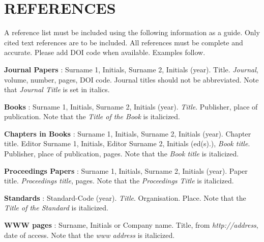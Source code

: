 \documentclass[10pt]{JoME}
\begin{document}
\section{REFERENCES}

A reference list must be included using the following information as a guide. Only cited text references are to be included. All references must be complete and accurate. Please add DOI code when available. Examples follow.
 
\textrm{\textbf{Journal Papers}  \cite{bib1}: 
Surname 1, Initials, Surname 2, Initials (year). Title. \textit{Journal}, volume, number, pages, DOI code. Journal titles should not be abbreviated. Note that \textit{Journal Title} is set in italics.} 

\textrm{\textbf{Books} \cite{bib2}: Surname 1, Initials, Surname 2, Initials (year). \textit{Title}. Publisher, place of publication. Note that the \textit{Title of the Book} is italicized.} 

\textrm{\textbf{Chapters in Books} \cite{bib3}:
Surname 1, Initials, Surname 2, Initials (year). Chapter title. Editor Surname 1, Initials, Editor Surname 2, Initials (ed(s).), \textit{Book title}. Publisher, place of publication, pages. Note that the \textit{Book title} is italicized.}

\textrm{\textbf{Proceedings Papers}  \cite{bib4}:
Surname 1, Initials, Surname 2, Initials (year). Paper title. \textit{Proceedings title}, pages. Note that the \textit{Proceedings Title} is italicized.}

\textrm{\textbf{Standards} \cite{bib5}: Standard-Code (year). \textit{Title}. Organisation. Place. Note that the \textit{Title of the Standard} is italicized.}

\textrm{\textbf{WWW pages} \cite{bib6}: 
Surname, Initials or Company name. Title, from \textit{http://address}, date of access. Note that the \textit{www address} is italicized.}
 
\end{document}
